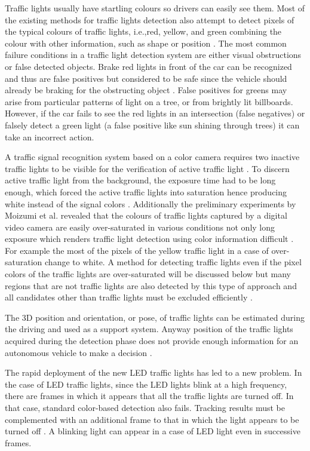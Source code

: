 \documentclass[letterpaper, 10 pt, conference]{ieeeconf} %
\begin{document}
Traffic lights usually have startling colours so drivers can easily see them. Most of the existing methods for traffic lights detection also attempt to detect pixels of the typical colours of traffic lights, i.e.,red, yellow, and green combining the colour with other information, such as shape or position \cite{c3}. The most common failure conditions in a traffic light detection system are either visual obstructions or false detected objects. Brake red lights in front of the car can be recognized and thus are false positives but considered to be safe since the vehicle should already be braking for the obstructing object \cite{c5}. False positives for greens may arise from particular patterns of light on a tree, or from brightly lit billboards\cite{c5}. However, if the car fails to see the red lights in an intersection (false negatives) or falsely detect a green light (a false positive like sun shining through trees) it can take an incorrect action. 

A traffic signal recognition system based on a color camera requires two inactive traffic lights to be visible for the verification of active traffic light \cite{c6}. To discern active traffic light from the background, the exposure time had to be long enough, which forced the active traffic lights into saturation hence producing white instead of the signal colors \cite{c6}. Additionally the preliminary experiments by Moizumi et al. revealed that the colours of traffic lights captured by a digital video camera are easily over-saturated in various conditions not only long exposure which renders traffic light detection using color information difficult \cite{c3}. For example the most of the pixels of the yellow traffic light in a case of over-saturation change to white. A method for detecting traffic lights even if the pixel colors of the traffic lights are over-saturated will be discussed below but many regions that are not traffic lights are also detected by this type of approach and all candidates other than traffic lights must be excluded efficiently \cite{c3}.

The 3D position and orientation, or pose, of traffic lights can be estimated during the driving and used as a support system. Anyway position of the traffic lights acquired during the detection phase does not provide enough information for an autonomous vehicle to make a decision \cite{c7}.

The rapid deployment of the new LED traffic lights has led to a new problem. In the case of LED traffic lights, since the LED lights blink at a high frequency, there are frames in which it appears that all the traffic lights are turned off. In that case, standard color-based detection also fails. Tracking results must be complemented with an additional frame to that in which the light appears to be turned off \cite{c3}. A blinking light can appear in a case of LED light even in successive frames.
\end{document}
